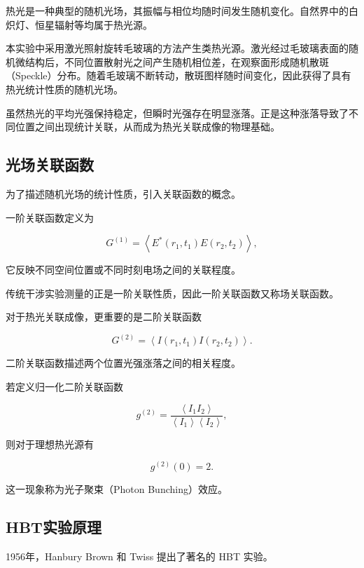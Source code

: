 \documentclass[a4paper]{ctexart}
\begin{document}
热光是一种典型的随机光场，其振幅与相位均随时间发生随机变化。自然界中的白炽灯、恒星辐射等均属于热光源。

本实验中采用激光照射旋转毛玻璃的方法产生类热光源。激光经过毛玻璃表面的随机微结构后，不同位置散射光之间产生随机相位差，在观察面形成随机散斑（Speckle）分布。随着毛玻璃不断转动，散斑图样随时间变化，因此获得了具有热光统计性质的随机光场。

虽然热光的平均光强保持稳定，但瞬时光强存在明显涨落。正是这种涨落导致了不同位置之间出现统计关联，从而成为热光关联成像的物理基础。

\subsection{光场关联函数}

为了描述随机光场的统计性质，引入关联函数的概念。

一阶关联函数定义为

\begin{equation}
G^{(1)}
=
\left<
E^*(r_1,t_1)
E(r_2,t_2)
\right>,
\end{equation}

它反映不同空间位置或不同时刻电场之间的关联程度。

传统干涉实验测量的正是一阶关联性质，因此一阶关联函数又称场关联函数。

对于热光关联成像，更重要的是二阶关联函数

\begin{equation}
G^{(2)}
=
\left<
I(r_1,t_1)
I(r_2,t_2)
\right>.
\end{equation}

二阶关联函数描述两个位置光强涨落之间的相关程度。

若定义归一化二阶关联函数

\begin{equation}
g^{(2)}
=
\frac
{\left<I_1I_2\right>}
{\left<I_1\right>\left<I_2\right>},
\end{equation}

则对于理想热光源有

\begin{equation}
g^{(2)}(0)=2.
\end{equation}

这一现象称为光子聚束（Photon Bunching）效应。

\subsection{HBT实验原理}

1956年，Hanbury Brown 和 Twiss 提出了著名的 HBT 实验。
\end{document}
